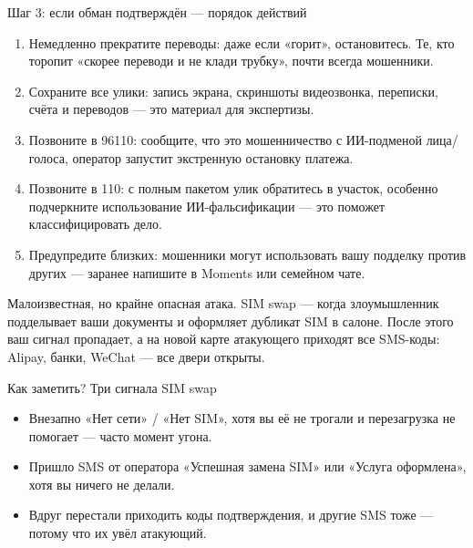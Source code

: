 \begin{tcbwarn}{Шаг 3: если обман подтверждён — порядок действий}
\begin{enumerate}
  \item Немедленно прекратите переводы: даже если «горит», остановитесь. Те, кто торопит «скорее переводи и не клади трубку», почти всегда мошенники.
  \item Сохраните все улики: запись экрана, скриншоты видеозвонка, переписки, счёта и переводов — это материал для экспертизы.
  \item Позвоните в 96110: сообщите, что это мошенничество с ИИ-подменой лица/голоса, оператор запустит экстренную остановку платежа.
  \item Позвоните в 110: с полным пакетом улик обратитесь в участок, особенно подчеркните использование ИИ-фальсификации — это поможет классифицировать дело.
  \item Предупредите близких: мошенники могут использовать вашу подделку против других — заранее напишите в Moments или семейном чате.
\end{enumerate}

\end{tcbwarn}


Малоизвестная, но крайне опасная атака. SIM swap — когда злоумышленник подделывает ваши документы и оформляет дубликат SIM в салоне. После этого ваш сигнал пропадает, а на новой карте атакующего приходят все SMS-коды: Alipay, банки, WeChat — все двери открыты.

\begin{tcbinfo}{Как заметить? Три сигнала SIM swap}
\begin{itemize}
  \item Внезапно «Нет сети» / «Нет SIM», хотя вы её не трогали и перезагрузка не помогает — часто момент угона.
  \item Пришло SMS от оператора «Успешная замена SIM» или «Услуга оформлена», хотя вы ничего не делали.
  \item Вдруг перестали приходить коды подтверждения, и другие SMS тоже — потому что их увёл атакующий.
\end{itemize}

\end{tcbinfo}

